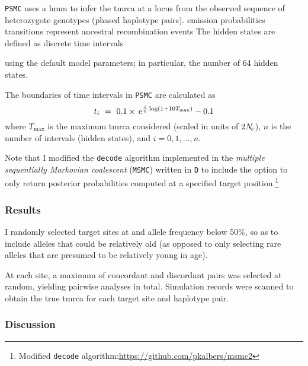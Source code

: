 \texttt{PSMC} uses a \gls{hmm} to infer the \gls{tmrca} at a locus from the observed sequence of heterozygote genotypes (phased haplotype pairs).
emission probabilities
transitions represent ancestral recombination events
The hidden states are defined as discrete time intervals



using the default model parameters; in particular, the number of 64 hidden states.

The boundaries of time intervals in \texttt{PSMC} are calculated as
\begin{equation*}
	t_i ~=~ 0.1 \times \,\mathrm{e}^{\frac{i}{n}\log(1 + 10  T_{\max})} - 0.1
\end{equation*}
where $T_{\max}$ is the maximum \gls{tmrca} considered (scaled in units of $2N_{\!e}$), $n$ is the number of intervals (\ie hidden states), and ${i=0,1,\ldots,n}$.

Note that I modified the \texttt{decode} algorithm implemented in the \emph{multiple sequentially Markovian coalescent} (\texttt{MSMC}) written in \texttt{D} to include the option to only return posterior probabilities computed at a specified target position.\footnote{Modified \texttt{decode} algorithm:\url{https://github.com/pkalbers/msmc2} }


%
\subsubsection{Results}
%

I randomly selected  target sites at  and allele frequency below 50\%, so as to include alleles that could be relatively old (as opposed to only selecting rare alleles that are presumed to be relatively young in age).

At each site, a maximum of  concordant and discordant pairs was selected at random, yielding  pairwise analyses in total.
Simulation records were scanned to obtain the true \gls{tmrca} for each target site and haplotype pair.




%

%



%

%



%

%


%

%



%
\subsubsection{Discussion}
%
